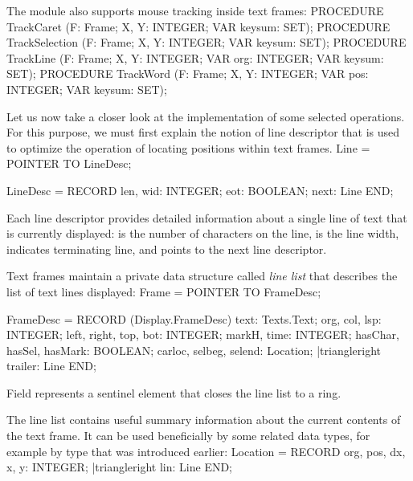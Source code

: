\noindent The module also supports mouse tracking inside text frames:
\begintt
PROCEDURE TrackCaret (F: Frame; X, Y: INTEGER; VAR keysum: SET);
PROCEDURE TrackSelection (F: Frame; X, Y: INTEGER; VAR keysum: SET);
PROCEDURE TrackLine (F: Frame; X, Y: INTEGER; VAR org: INTEGER; VAR keysum: SET);
PROCEDURE TrackWord (F: Frame; X, Y: INTEGER; VAR pos: INTEGER; VAR keysum: SET);
\endtt

\noindent Let us now take a closer look at the implementation of some selected operations. For this purpose, we must first explain the notion of line descriptor that is used to optimize the operation of locating positions within text frames.
\begintt
Line = POINTER TO LineDesc;

LineDesc = RECORD
  len, wid: INTEGER;
  eot: BOOLEAN;
  next: Line
END;
\endtt

\noindent Each line descriptor provides detailed information about a single line of text that is currently displayed:  is the number of characters on the line,  is the line width,  indicates terminating line, and  points to the next line descriptor.

Text frames maintain a private data structure called \emph{line list} that describes the list of text lines displayed:
\begintt
Frame = POINTER TO FrameDesc;

FrameDesc = RECORD (Display.FrameDesc)
  text: Texts.Text;
  org, col, lsp: INTEGER;
  left, right, top, bot: INTEGER;
  markH, time: INTEGER;
  hasChar, hasSel, hasMark: BOOLEAN;
  carloc, selbeg, selend: Location;
|triangleright trailer: Line
END;
\endtt

\noindent Field  represents a sentinel element that closes the line list to a ring.

The line list contains useful summary information about the current contents of the text frame. It can be used beneficially by some related data types, for example by type  that was introduced earlier:
\begintt
Location = RECORD
  org, pos, dx, x, y: INTEGER;
|triangleright lin: Line
END;
\endtt

